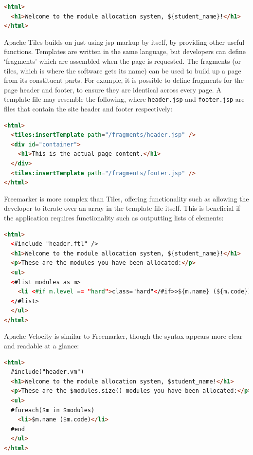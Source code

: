 \documentclass[draft]{scrartcl}
\begin{document}
\begin{lstlisting}[language=HTML]
<html>
  <h1>Welcome to the module allocation system, ${student_name}!</h1>
</html>
\end{lstlisting}


Apache Tiles builds on just using \gls{jsp} markup by itself, by providing
other useful functions. Templates are written in the same language, but
developers can define `fragments' which are assembled when the page is
requested. The fragments (or tiles, which is where the software gets its name)
can be used to build up a page from its constituent parts. For example, it is
possible to define fragments for the page header and footer, to ensure they
are identical across every page. A template file may resemble the following,
where \texttt{header.jsp} and \texttt{footer.jsp} are files that contain the
site header and footer respectively:

\begin{lstlisting}[language=HTML]
<html>
  <tiles:insertTemplate path="/fragments/header.jsp" />
  <div id="container">
    <h1>This is the actual page content.</h1>
  </div>
  <tiles:insertTemplate path="/fragments/footer.jsp" />
</html>
\end{lstlisting}


Freemarker is more complex than Tiles, offering functionality such as allowing
the developer to iterate over an array in the template file itself. This is
beneficial if the application requires functionality such as outputting lists
of elements:

\begin{lstlisting}[language=HTML]
<html>
  <#include "header.ftl" />
  <h1>Welcome to the module allocation system, ${student_name}!</h1>
  <p>These are the modules you have been allocated:</p>
  <ul>
  <#list modules as m>
    <li <#if m.level == "hard">class="hard"</#if>>${m.name} (${m.code})</li>
  </#list>
  </ul>
</html>
\end{lstlisting}


Apache Velocity is similar to Freemarker, though the syntax appears more clear
and readable at a glance:

\begin{lstlisting}[language=HTML]
<html>
  #include("header.vm")
  <h1>Welcome to the module allocation system, $student_name!</h1>
  <p>These are the $modules.size() modules you have been allocated:</p>
  <ul>
  #foreach($m in $modules)
    <li>$m.name ($m.code)</li>
  #end
  </ul>
</html>
\end{lstlisting}
\end{document}
